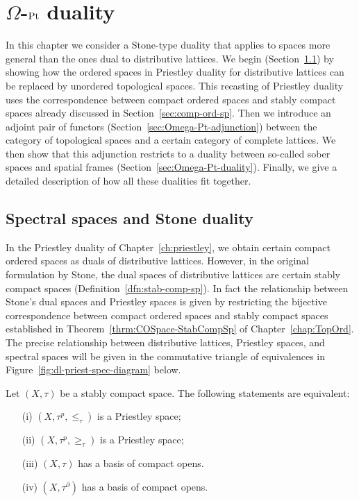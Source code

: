 \chapter{\texorpdfstring{$\Omega$}{Omega}-\texorpdfstring{$\mathrm{Pt}$}{Pt} duality}\label{chap:Omega-Pt}
In this chapter we consider a Stone-type duality that applies to spaces more
general than the ones dual to distributive lattices. We begin
(Section~\ref{sec:StoneSpaces}) by showing how the ordered spaces in Priestley
duality for distributive lattices can be replaced by unordered topological
spaces. This recasting of Priestley duality uses the correspondence between compact ordered spaces and stably compact spaces already discussed in Section~\ref{sec:comp-ord-sp}. Then we introduce
an adjoint pair of functors (Section~\ref{sec:Omega-Pt-adjunction}) between the
category of topological spaces and a certain category of complete lattices. We
then show that this adjunction restricts to a duality between so-called sober
spaces and spatial frames (Section~\ref{sec:Omega-Pt-duality}). Finally, we give
a detailed description of how all these dualities fit together.


\section{Spectral spaces and Stone duality}\label{sec:StoneSpaces}
In the Priestley duality of Chapter~\ref{ch:priestley}, we obtain certain compact ordered spaces as duals of distributive lattices. However, in the original formulation by Stone, the dual spaces of distributive lattices are certain stably compact spaces (Definition~\ref{dfn:stab-comp-sp}). In fact the relationship between Stone's dual spaces and Priestley spaces is given by restricting the bijective correspondence between compact ordered spaces and stably compact spaces established in Theorem~\ref{thrm:COSpace-StabCompSp} of Chapter~\ref{chap:TopOrd}. The precise relationship between distributive lattices, Priestley spaces, and spectral spaces will be given in the commutative triangle of equivalences in Figure~\ref{fig:dl-priest-spec-diagram} below.


\begin{theorem}\label{thrm:Priestley-Stone}
Let $(X,\tau)$ be a stably compact space. The following statements are equivalent:
\begin{enumerate}
\item[(i)] $(X,\tau^p,\leq_\tau)$ is a Priestley space;
\item[(ii)] $(X,\tau^p,\geq_\tau)$ is a Priestley space;
\item[(iii)] $(X,\tau)$ has a basis of compact opens.
\item[(iv)] $(X,\tau^\partial)$ has a basis of compact opens.
\end{enumerate}
\end{theorem}


